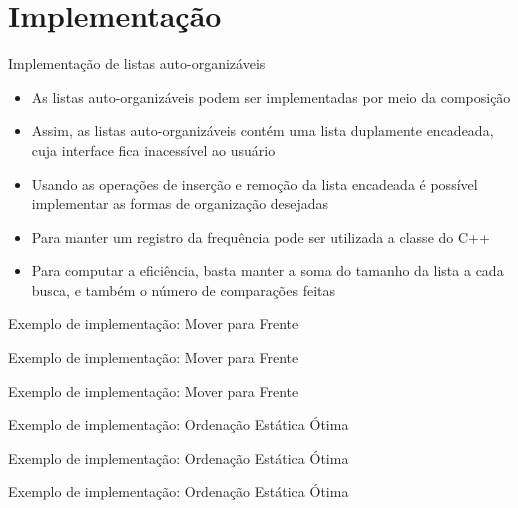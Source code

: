 \section{Implementação}

\begin{frame}[fragile]{Implementação de listas auto-organizáveis}

    \begin{itemize}
        \item As listas auto-organizáveis podem ser implementadas por meio da composição

        \item Assim, as listas auto-organizáveis contém uma lista duplamente encadeada, cuja
            interface fica inacessível ao usuário

        \item Usando as operações de inserção e remoção da lista encadeada é possível
            implementar as formas de organização desejadas

        \item Para manter um registro da frequência pode ser utilizada a classe 
             do C++

        \item Para computar a eficiência, basta manter a soma do tamanho da lista a cada 
            busca, e também o número de comparações feitas
    \end{itemize}

\end{frame}

\begin{frame}[fragile]{Exemplo de implementação: Mover para Frente}
\end{frame}

\begin{frame}[fragile]{Exemplo de implementação: Mover para Frente}
\end{frame}

\begin{frame}[fragile]{Exemplo de implementação: Mover para Frente}
\end{frame}

\begin{frame}[fragile]{Exemplo de implementação: Ordenação Estática Ótima}
\end{frame}

\begin{frame}[fragile]{Exemplo de implementação: Ordenação Estática Ótima}
\end{frame}

\begin{frame}[fragile]{Exemplo de implementação: Ordenação Estática Ótima}
\end{frame}
